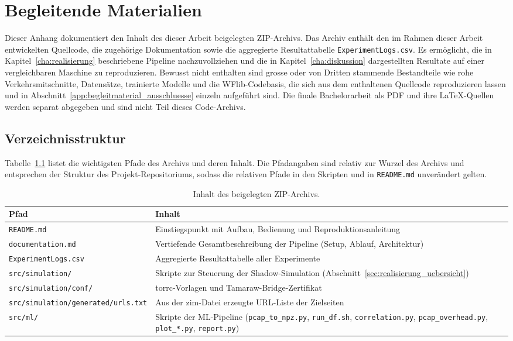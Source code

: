 \chapter{Begleitende Materialien}
\label{app:begleitmaterial}

Dieser Anhang dokumentiert den Inhalt des dieser Arbeit beigelegten ZIP-Archivs.
Das Archiv enthält den im Rahmen dieser Arbeit entwickelten Quellcode, die zugehörige Dokumentation sowie die aggregierte Resultattabelle \texttt{ExperimentLogs.csv}.
Es ermöglicht, die in Kapitel~\ref{cha:realisierung} beschriebene Pipeline nachzuvollziehen und die in Kapitel~\ref{cha:diskussion} dargestellten Resultate auf einer vergleichbaren Maschine zu reproduzieren.
Bewusst nicht enthalten sind grosse oder von Dritten stammende Bestandteile wie rohe Verkehrsmitschnitte, Datensätze, trainierte Modelle und die WFlib-Codebasis, die sich aus dem enthaltenen Quellcode reproduzieren lassen und in Abschnitt~\ref{app:begleitmaterial_ausschluesse} einzeln aufgeführt sind.
Die finale Bachelorarbeit als PDF und ihre LaTeX-Quellen werden separat abgegeben und sind nicht Teil dieses Code-Archivs.

\section{Verzeichnisstruktur}
\label{app:begleitmaterial_struktur}

Tabelle~\ref{tab:begleitmaterial_struktur} listet die wichtigsten Pfade des Archivs und deren Inhalt.
Die Pfadangaben sind relativ zur Wurzel des Archivs und entsprechen der Struktur des Projekt-Repositoriums, sodass die relativen Pfade in den Skripten und in \texttt{README.md} unverändert gelten.

\begin{table}[H]
\centering
\caption{Inhalt des beigelegten ZIP-Archivs.}
\label{tab:begleitmaterial_struktur}
\begin{tabular}{p{5.0cm}p{8.5cm}}
\hline
Pfad & Inhalt \\
\hline
\texttt{README.md} & Einstiegspunkt mit Aufbau, Bedienung und Reproduktionsanleitung \\
\texttt{documentation.md} & Vertiefende Gesamtbeschreibung der Pipeline (Setup, Ablauf, Architektur) \\
\texttt{ExperimentLogs.csv} & Aggregierte Resultattabelle aller Experimente \\
\texttt{src/simulation/} & Skripte zur Steuerung der Shadow-Simulation (Abschnitt~\ref{sec:realisierung_uebersicht}) \\
\texttt{src/simulation/conf/} & torrc-Vorlagen und Tamaraw-Bridge-Zertifikat \\
\texttt{src/simulation/generated/urls.txt} & Aus der \gls{zim}-Datei erzeugte URL-Liste der Zielseiten \\
\texttt{src/ml/} & Skripte der ML-Pipeline (\texttt{pcap\_to\_npz.py}, \texttt{run\_df.sh}, \texttt{correlation.py}, \texttt{pcap\_overhead.py}, \texttt{plot\_*.py}, \texttt{report.py}) \\
\hline
\end{tabular}
\end{table}

